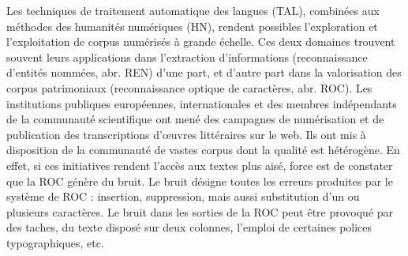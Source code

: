 Les techniques de traitement automatique des langues (TAL), combinées aux méthodes des humanités numériques (HN), rendent possibles l'exploration et l'exploitation de corpus numérisés à grande échelle. Ces deux domaines trouvent souvent leurs applications dans l'extraction d'informations (reconnaissance d'entités nommées, abr. REN) d'une part, et d'autre part dans la valorisation des corpus patrimoniaux (reconnaissance optique de caractères, abr. ROC).
Les institutions publiques européennes, internationales et des membres indépendants de la communauté scientifique
ont mené des campagnes de numérisation et de publication des transcriptions d’œuvres littéraires sur le web. Ils ont mis à disposition de la communauté de vastes corpus dont la qualité est hétérogène.
En effet, si ces initiatives rendent l'accès aux textes plus aisé, force est de constater que la ROC génère du bruit. Le bruit désigne toutes les erreurs produites par le système de ROC : insertion, suppression, mais aussi substitution d'un ou plusieurs caractères. Le bruit dans les sorties de la ROC peut être provoqué par des taches, du texte disposé sur deux colonnes, l'emploi de certaines polices typographiques, etc.


%

